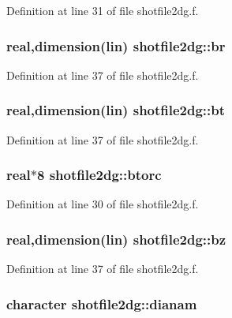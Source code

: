 Definition at line 31 of file shotfile2dg.f.\hypertarget{namespaceshotfile2dg_aab63facede49889cb1dd91c24755639}{
\subsubsection[br]{\setlength{\rightskip}{0pt plus 5cm}real,dimension({\bf lin}) {\bf shotfile2dg::br}}}
\label{namespaceshotfile2dg_aab63facede49889cb1dd91c24755639}




Definition at line 37 of file shotfile2dg.f.\hypertarget{namespaceshotfile2dg_286a74f661b48f942a47cd92a9b88012}{
\subsubsection[bt]{\setlength{\rightskip}{0pt plus 5cm}real,dimension({\bf lin}) {\bf shotfile2dg::bt}}}
\label{namespaceshotfile2dg_286a74f661b48f942a47cd92a9b88012}




Definition at line 37 of file shotfile2dg.f.\hypertarget{namespaceshotfile2dg_86c17dafb5ef893787c9df16f528735b}{
\subsubsection[btorc]{\setlength{\rightskip}{0pt plus 5cm}real$\ast$8 {\bf shotfile2dg::btorc}}}
\label{namespaceshotfile2dg_86c17dafb5ef893787c9df16f528735b}




Definition at line 30 of file shotfile2dg.f.\hypertarget{namespaceshotfile2dg_bbe37b790a236f45707d1c9682d0c2d1}{
\subsubsection[bz]{\setlength{\rightskip}{0pt plus 5cm}real,dimension({\bf lin}) {\bf shotfile2dg::bz}}}
\label{namespaceshotfile2dg_bbe37b790a236f45707d1c9682d0c2d1}




Definition at line 37 of file shotfile2dg.f.\hypertarget{namespaceshotfile2dg_1c6b6dc13c91c970234997299500e842}{
\subsubsection[dianam]{\setlength{\rightskip}{0pt plus 5cm}character {\bf shotfile2dg::dianam}}}
\label{namespaceshotfile2dg_1c6b6dc13c91c970234997299500e842}




